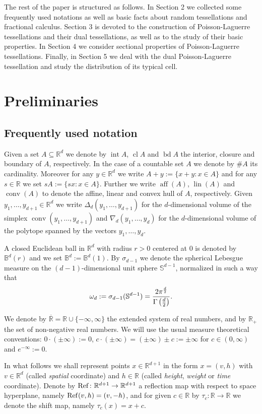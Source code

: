 \documentclass[11pt,a4paper]{article}
\theoremstyle{plain}
\theoremstyle{definition}
\theoremstyle{remark}
\def\BB{\mathbb{B}}
\def\RR{\mathbb{R}}
\def\SS{\mathbb{S}}
\newcommand{\conv}{\mathop{\mathrm{conv}}\nolimits}
\newcommand{\aff}{\mathop{\mathrm{aff}}\nolimits}
\newcommand{\lin}{\mathop{\mathrm{lin}}\nolimits}
\newcommand{\inter}{\operatorname{int}}
\newcommand{\bd}{\operatorname{bd}}
\newcommand{\cl}{\mathop{\mathrm{cl}}\nolimits}
\begin{document}
The rest of the paper is structured as follows. In Section 2 we collected some frequently used notations as well as basic facts about random tessellations and fractional calculus. Section 3 is devoted to the construction of Poisson-Laguerre tessellations and their dual tessellations, as well as to the study of their basic properties. In Section 4 we consider sectional properties of Poisson-Laguerre tessellations. Finally, in Section 5 we deal with the dual Poisson-Laguerre tessellation and study the distribution of its typical cell. 

\section{Preliminaries}

\subsection{Frequently used notation}

Given a set $A\subseteq\RR^d$ we denote by $\inter A$, $\cl A$ and $\bd A$ the interior, closure and boundary of $A$, respectively. In the case of a countable set $A$ we denote by $\# A$ its cardinality. Moreover for any $y\in\RR^d$ we write $A+y:=\{x+y\colon x\in A\}$ and for any $s\in \RR$ we set $sA:=\{sx\colon x\in A\}$. Further we write $\aff(A)$, $\lin(A)$ and $\conv(A)$ to denote the affine, linear and convex hull of $A$, respectively. Given $y_1,\ldots,y_{d+1}\in\RR^d$ we write $\Delta_{d}(y_1,\dots,y_{d+1})$ for the $d$-dimensional volume of the simplex $\conv(y_1,\ldots,y_{d+1})$ and $\nabla_{d}(y_1,\dots, y_d)$ for the $d$-dimensional volume of the polytope spanned by the vectors $y_1,\ldots,y_d$.

A closed Euclidean ball in $\RR^d$ with radius $r>0$ centered at $0$ is denoted by $\BB^d(r)$ and we set $\BB^d:=\BB^d(1)$. By $\sigma_{d-1}$ we denote the spherical Lebesgue measure on the $(d-1)$-dimensional unit sphere $\SS^{d-1}$, normalized in such a way that
$$
    \omega_d:=\sigma_{d-1}(\SS^{d-1})={2\pi^{d\over 2}\over \Gamma\left({d\over 2}\right)}.
$$

We denote by $\overline{\RR}=\RR\cup\{-\infty,\infty\}$ the extended system of real numbers, and by $\RR_+$ the set of non-negative real numbers. We will use the usual measure theoretical conventions: $0\cdot (\pm\infty):=0$, $c\cdot(\pm\infty)=(\pm\infty)\pm c:=\pm\infty$ for $c\in (0,\infty)$ and $e^{-\infty}:=0$. 

In what follows we shall represent points $x\in\RR^{d+1}$ in the form $x=(v,h)$ with $v\in\RR^{d}$ (called \textit{spatial} coordinate) and $h\in\RR$ (called \textit{height}, \textit{weight} or \textit{time} coordinate). Denote by ${\rm Ref}\colon\RR^{d+1}\to\RR^{d+1}$ a reflection map with respect to space hyperplane, namely ${\rm Ref}(v,h)=(v,-h)$, and for given $c\in\RR$ by $\tau_c\colon\RR\to\RR$ we denote the shift map, namely $\tau_c(x)=x+c$.
\end{document}
